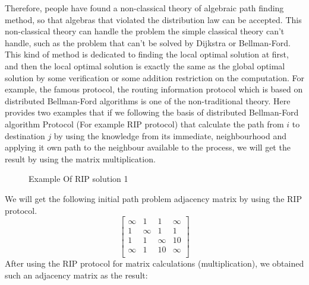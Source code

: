 \documentclass[a4paper,12pt,twoside,openright]{report}
\begin{document}
Therefore, people have found a non-classical theory of algebraic path finding method, so that algebras that violated the distribution law can be accepted. This non-classical theory can handle the problem the simple classical theory can't handle, such as the problem that can't be solved by Dijkstra or Bellman-Ford.
This kind of method is dedicated to finding the local optimal solution at first, and then the local optimal solution is exactly the same as the global optimal solution by some verification or some addition restriction on the computation. For example, the famous protocol, the routing information protocol which is based on distributed Bellman-Ford algorithms is one of the non-traditional theory.
Here provides two examples that if we following the basis of distributed Bellman-Ford algorithm Protocol (For example RIP protocol) that calculate the path from $i$ to destination $j$ by using the knowledge from its immediate, neighbourhood and applying it own path to the neighbour available to the process, we will get the result by using the matrix multiplication.
\begin{figure}[H]
\centering
{}
\label{example:rip:1}
\caption{Example Of RIP solution 1}
\end{figure}
We will get the following initial path problem adjacency matrix by using the RIP protocol.
\[
\begin{bmatrix}
    \infty & 1 & 1 & \infty \\
    1 & \infty & 1 & 1 \\
    1 & 1 & \infty & 10 \\
    \infty & 1 & 10 & \infty \\
\end{bmatrix}
\]
After using the RIP protocol for matrix calculations (multiplication), we obtained such an adjacency matrix as the result:
\end{document}
